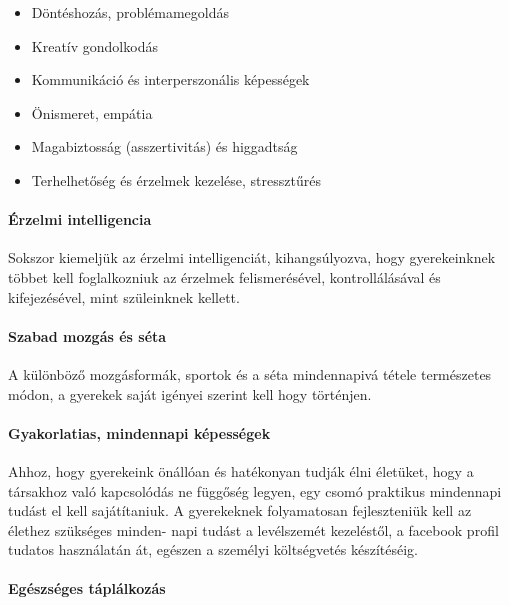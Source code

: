 \begin{itemize}

\item
  Döntéshozás, problémamegoldás
\item
  Kreatív gondolkodás
\item
  Kommunikáció és interperszonális képességek
\item
  Önismeret, empátia
\item
  Magabiztosság (asszertivitás) és higgadtság
\item
  Terhelhetőség és érzelmek kezelése, stressztűrés
\end{itemize}

\paragraph{Érzelmi intelligencia}\label{uxe9rzelmi-intelligencia}

Sokszor kiemeljük az érzelmi intelligenciát, kihangsúlyozva, hogy
gyerekeinknek többet kell foglalkozniuk az érzelmek felismerésével,
kontrollálásával és kifejezésével, mint szüleinknek kellett.

\paragraph{Szabad mozgás és séta}\label{szabad-mozguxe1s-uxe9s-suxe9ta}

A különböző mozgásformák, sportok és a séta mindennapivá tétele
természetes módon, a gyerekek saját igényei szerint kell hogy történjen.

\paragraph{Gyakorlatias, mindennapi
képességek}\label{gyakorlatias-mindennapi-kuxe9pessuxe9gek}

Ahhoz, hogy gyerekeink önállóan és hatékonyan tudják élni életüket, hogy
a társakhoz való kapcsolódás ne függőség legyen, egy csomó praktikus
mindennapi tudást el kell sajátítaniuk. A gyerekeknek folyamatosan
fejleszteniük kell az élethez szükséges minden- napi tudást a
levélszemét kezeléstől, a facebook profil tudatos használatán át,
egészen a személyi költségvetés készítéséig.

\paragraph{Egészséges
táplálkozás}\label{eguxe9szsuxe9ges-tuxe1pluxe1lkozuxe1s}

